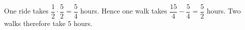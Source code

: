 One ride takes $\dfrac{1}{2}\cdot\dfrac{5}{2}=\dfrac{5}{4}$ hours. Hence one walk takes $\dfrac{15}{4}-\dfrac{5}{4}=\dfrac{5}{2}$ hours. Two walks therefore take $\boxed5$ hours.

